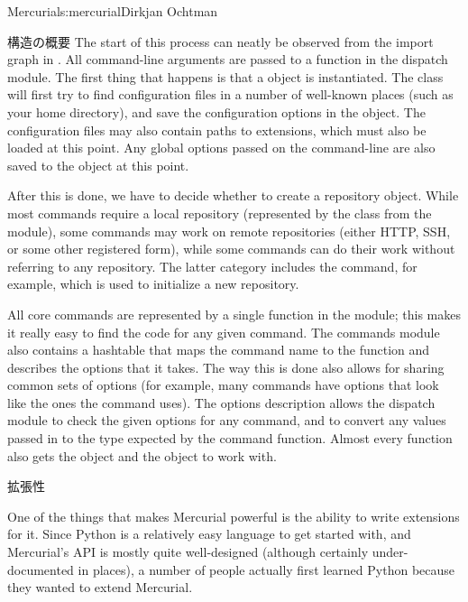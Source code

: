 \begin{aosachapter}{Mercurial}{s:mercurial}{Dirkjan Ochtman}
\begin{aosasect1}{構造の概要}
The start of this process can neatly be observed from the import graph
in . All command-line arguments are
passed to a function in the dispatch module. The first thing that
happens is that a  object is instantiated. The 
class will first try to find configuration files in a number of
well-known places (such as your home directory), and save the
configuration options in the  object. The configuration files
may also contain paths to extensions, which must also be loaded at
this point. Any global options passed on the command-line are also
saved to the  object at this point.

After this is done, we have to decide whether to create a repository
object. While most commands require a local repository (represented
by the  class from the  module), some
commands may work on remote repositories (either HTTP, SSH, or some
other registered form), while some commands can do their work without
referring to any repository. The latter category includes the
 command, for example, which is used to initialize a new
repository.

All core commands are represented by a single function in the
 module; this makes it really easy to find the code for
any given command. The commands module also contains a hashtable that
maps the command name to the function and describes the options that
it takes. The way this is done also allows for sharing common sets of
options (for example, many commands have options that look like the
ones the  command uses). The options description allows the
dispatch module to check the given options for any command, and to
convert any values passed in to the type expected by the command
function. Almost every function also gets the  object and the
 object to work with.

\end{aosasect1}

\begin{aosasect1}{拡張性}

One of the things that makes Mercurial powerful is the ability to
write extensions for it. Since Python is a relatively easy language to
get started with, and Mercurial's API is mostly quite well-designed
(although certainly under-documented in places), a number of people
actually first learned Python because they wanted to extend Mercurial.


\end{aosasect1}
\end{aosachapter}
